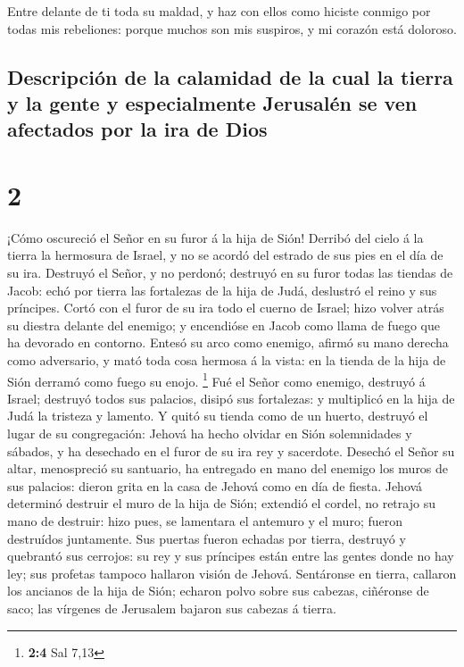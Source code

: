  Entre delante de ti toda su maldad, y haz con ellos como
hiciste conmigo por todas mis rebeliones: porque muchos son mis
suspiros, y mi corazón está doloroso.

\hypertarget{descripciuxf3n-de-la-calamidad-de-la-cual-la-tierra-y-la-gente-y-especialmente-jerusaluxe9n-se-ven-afectados-por-la-ira-de-dios}{%
\subsection{Descripción de la calamidad de la cual la tierra y la gente
y especialmente Jerusalén se ven afectados por la ira de
Dios}\label{descripciuxf3n-de-la-calamidad-de-la-cual-la-tierra-y-la-gente-y-especialmente-jerusaluxe9n-se-ven-afectados-por-la-ira-de-dios}}

\hypertarget{section-1}{%
\section{2}\label{section-1}}

 ¡Cómo oscureció el Señor en su furor á la hija de Sión!
Derribó del cielo á la tierra la hermosura de Israel, y no se acordó del
estrado de sus pies en el día de su ira.  Destruyó el Señor,
y no perdonó; destruyó en su furor todas las tiendas de Jacob: echó por
tierra las fortalezas de la hija de Judá, deslustró el reino y sus
príncipes.  Cortó con el furor de su ira todo el cuerno de
Israel; hizo volver atrás su diestra delante del enemigo; y encendióse
en Jacob como llama de fuego que ha devorado en contorno. 
Entesó su arco como enemigo, afirmó su mano derecha como adversario, y
mató toda cosa hermosa á la vista: en la tienda de la hija de Sión
derramó como fuego su enojo. \footnote{\textbf{2:4} Sal 7,13}
 Fué el Señor como enemigo, destruyó á Israel; destruyó
todos sus palacios, disipó sus fortalezas: y multiplicó en la hija de
Judá la tristeza y lamento.  Y quitó su tienda como de un
huerto, destruyó el lugar de su congregación: Jehová ha hecho olvidar en
Sión solemnidades y sábados, y ha desechado en el furor de su ira rey y
sacerdote.  Desechó el Señor su altar, menospreció su
santuario, ha entregado en mano del enemigo los muros de sus palacios:
dieron grita en la casa de Jehová como en día de fiesta. 
Jehová determinó destruir el muro de la hija de Sión; extendió el
cordel, no retrajo su mano de destruir: hizo pues, se lamentara el
antemuro y el muro; fueron destruídos juntamente.  Sus
puertas fueron echadas por tierra, destruyó y quebrantó sus cerrojos: su
rey y sus príncipes están entre las gentes donde no hay ley; sus
profetas tampoco hallaron visión de Jehová.  Sentáronse en
tierra, callaron los ancianos de la hija de Sión; echaron polvo sobre
sus cabezas, ciñéronse de saco; las vírgenes de Jerusalem bajaron sus
cabezas á tierra.

